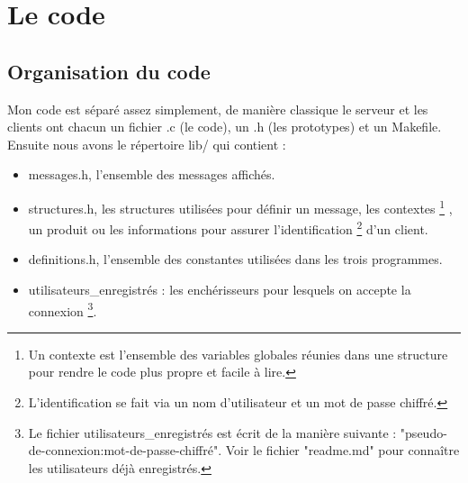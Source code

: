 \chapter{Le code}
\section{Organisation du code}
Mon code est séparé assez simplement, de manière classique le serveur et les clients ont chacun un fichier .c (le code), un .h (les prototypes) et un Makefile.
Ensuite nous avons le répertoire lib/ qui contient :
\begin{itemize}
\item messages.h, l'ensemble des messages affichés.
\item structures.h, les structures utilisées pour définir un message, les contextes
\protect\footnote{
	Un contexte est l'ensemble des variables globales réunies dans une structure pour 
	rendre le code plus propre et facile à lire.
}
, un produit ou les informations pour assurer l'identification
\protect\footnote{
	L'identification se fait via un nom d'utilisateur et un mot de passe chiffré.
} d'un client.
\item definitions.h, l'ensemble des constantes utilisées dans les trois programmes.
\item utilisateurs\_enregistrés : les enchérisseurs pour lesquels on accepte la connexion
\protect\footnote{
	Le fichier utilisateurs\_enregistrés est écrit de la manière suivante : "pseudo-de-connexion:mot-de-passe-chiffré".
	Voir le fichier "readme.md" pour connaître les utilisateurs déjà enregistrés.
}.
\end{itemize}

